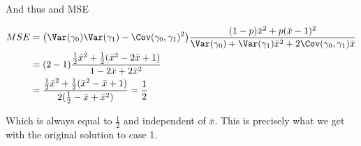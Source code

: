 And thus and MSE

\begin{align*}
	MSE &= \big(\Var(\gamma_0) \Var(\gamma_1) - \Cov(\gamma_0, \gamma_1)^2 \big)\frac{(1 - p) \bar{x}^2  + p(\bar{x} - 1)^2 }{\Var(\gamma_0) + \Var(\gamma_1) \bar{x}^2 + 2 \Cov(\gamma_0, \gamma_1) \bar{x}} \\
		&= (2 - 1)\frac{\frac{1}{2} \bar{x}^2 + \frac{1}{2}(\bar{x}^2 - 2 \bar{x} + 1)}{1 - 2 \bar{x} + 2 \bar{x}^2} \\
		&= \frac{\frac{1}{2} \bar{x}^2 + \frac{1}{2}(\bar{x}^2 -  \bar{x} + 1)}{2(\frac{1}{2} -  \bar{x} + \bar{x}^2)} = \frac{1}{2}
\end{align*} 

Which is always equal to $\frac{1}{2}$ and independent of $\bar{x}$. This is precisely what we get with the original solution to case 1.

